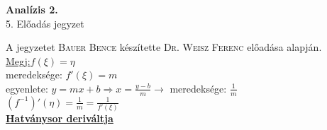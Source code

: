 \documentclass[a4paper,11pt]{article}
\begin{document}
\setlength\parindent{0pt}
\def\N{\mathbb{N}}
\def\Z{\mathbb{Z}}
\def\R{\mathbb{R}}
\def\biz{\normalsize{\underline{Bizonyítás:} }\hspace*{0.5cm}}
\def\tetel{\normalsize \textbf{\underline{Tétel}: }}
\def\defi{\normalsize \textbf{Definíció: }}
\def\limn{\displaystyle\lim_{n\to +\infty}}
\def\sumeu{\displaystyle\sum_{n=1}}
\def\sumun{\displaystyle\sum_{n=0}}
\def\sume{\displaystyle\sum_{n=1}^{\infty}}
\def\sumn{\displaystyle\sum_{n=0}^{\infty}}
\def\limh{\displaystyle\lim_{h\to0}}
\def\limxa{\displaystyle\lim_{x\to a}}
\def\limxatelj{\displaystyle\lim_{x\to a}\frac{f(x)-f(a)}{x-a}}
\def\pl{\textbf{Pl:}}
\def\rtr{\displaystyle\R\to\R}
\def\D{\displaystyle\mathcal{D}}
\def\lima{\displaystyle\lim_{a}}
\def\bizva{\quad\blacksquare}
\def\fda{f\in\D(a)}
\begin{center}
	{\LARGE\textbf{Analízis 2.}}\\[0.2cm]
	
	{\Large 5. Előadás jegyzet}\\[0.5cm]	
\end{center}
{\small A jegyzetet \textsc{Bauer Bence} készítette \textsc{Dr. Weisz Ferenc} előadása alapján.}\\[0.4cm]
\hspace*{0.5cm}\underline{Megj:}\hspace{1.7cm}$f(\xi)=\eta$\\[0.1cm]\hspace*{0.6cm} meredeksége: $f'(\xi) =m$\\[0.1cm]\hspace*{0.6cm} egyenlete: $y=mx+b\Rightarrow x=\frac{y-b}{m}\to$ meredeksége: $\frac{1}{m}$\\[0.1cm]\hspace*{0.6cm}$(f^{-1})' (\eta)=\frac{1}{m}=\frac{1}{f'(\xi)}$\\[0.2cm]
\textbf{\underline{Hatványsor deriváltja}}\\[0.2cm]
\end{document}
